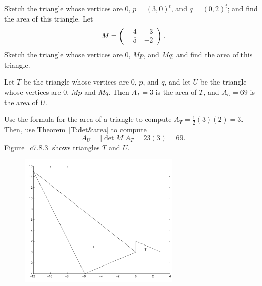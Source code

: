 \documentclass{ximera}
\begin{document}
\begin{exercise} \label{c7.8.3}
Sketch the triangle whose vertices are $0$, $p=(3,0)^t$, and
$q=(0,2)^t$; and find the area of this triangle.  Let
\[
M=\left(\begin{array}{rr} -4 & -3\\ 5 &-2\end{array}\right).
\]
Sketch the triangle whose vertices are $0$, $Mp$, and $Mq$; and
find the area of this triangle.

\begin{solution}

\ans Let $T$ be the triangle whose vertices are $0$, $p$, and $q$, and
let $U$ be the triangle whose vertices are $0$, $Mp$ and $Mq$.  Then
$A_T = 3$ is the area of $T$, and $A_U = 69$ is the area of $U$.

\soln Use the formula for the area of a triangle to compute
$A_T = \frac{1}{2}(3)(2) = 3$.  Then, use Theorem~\ref{T:det&area} to
compute
\[
A_U = |\det{M}|A_T = 23(3) = 69.
\]
Figure~\ref{c7.8.3} shows triangles $T$ and $U$.

\begin{figure}[htb]
		\centerline{%
		\includegraphics[width=3.0in]{exfigure/7-8-3.pdf}}
\end{figure}

\end{solution}
\end{exercise}
\end{document}
